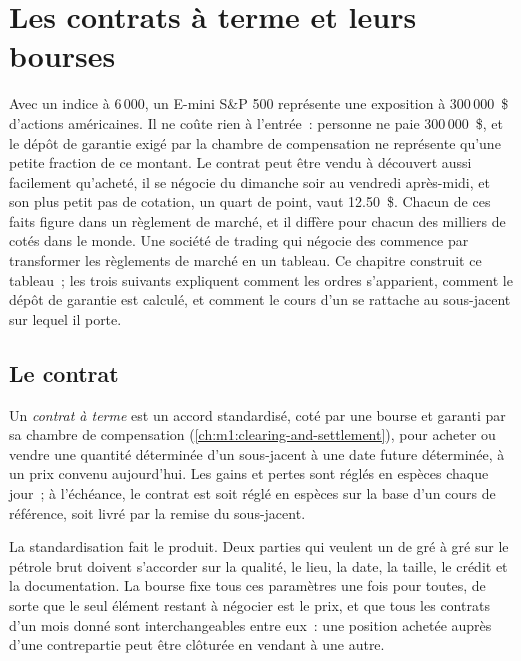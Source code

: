 \chapter{Les contrats à terme et leurs bourses}\label{ch:m1:futures-contracts-and-exchanges}

Avec un indice à 6\,000, un  E-mini S\&P 500 représente une exposition à
300\,000~\$ d'actions américaines. Il ne coûte rien à l'entrée~: personne ne paie
300\,000~\$, et le dépôt de garantie exigé par la chambre de compensation ne représente
qu'une petite fraction de ce montant. Le contrat peut être vendu à découvert aussi facilement qu'acheté, il se négocie du dimanche
soir au vendredi après-midi, et son plus petit pas de cotation, un quart de
point, vaut 12.50~\$. Chacun de ces faits figure dans un règlement de marché,
et il diffère pour chacun des milliers de  cotés dans le monde.
Une société de trading qui négocie des  commence par transformer les règlements de marché en un tableau. Ce
chapitre construit ce tableau~; les trois suivants expliquent comment les ordres s'apparient, comment le
dépôt de garantie est calculé, et comment le cours d'un  se rattache
au sous-jacent sur lequel il porte.

\section{Le contrat}

\begin{definition}\label{def:m1:futures-contracts-and-exchanges:future}
Un \emph{contrat à terme} est un accord standardisé,
coté par une bourse et garanti par sa chambre de compensation
(\cref{ch:m1:clearing-and-settlement}), pour acheter ou vendre une quantité déterminée
d'un sous-jacent à une date future déterminée, à un prix convenu aujourd'hui. Les gains et
pertes sont réglés en espèces chaque jour~; à l'échéance, le contrat est soit
réglé en espèces sur la base d'un cours de référence, soit livré par la remise du sous-jacent.
\end{definition}

La standardisation fait le produit. Deux parties qui veulent un  de gré à gré sur le pétrole brut
doivent s'accorder sur la qualité, le lieu, la date, la taille, le crédit et la documentation. La
bourse fixe tous ces paramètres une fois pour toutes, de sorte que le seul élément restant à négocier est
le prix, et que tous les contrats d'un mois donné sont interchangeables
entre eux~: une position achetée auprès d'une contrepartie peut être clôturée en vendant à
une autre.

